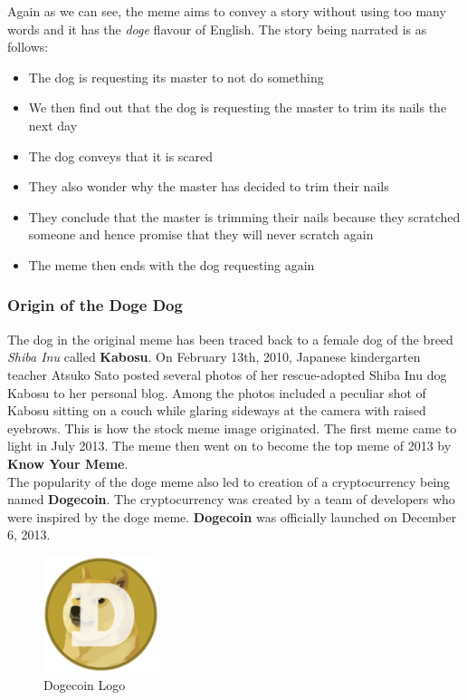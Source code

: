 \def\DevnagVersion{2.17}\documentclass{article}
\begin{document}
Again as we can see, the meme aims to convey a story without using too many words and it has the \textit{doge} flavour of English. The story being narrated is as follows:
\begin{itemize}
    \item The dog is requesting its master to not do something
    \item We then find out that the dog is requesting the master to trim its nails the next day
    \item The dog conveys that it is scared
    \item They also wonder why the master has decided to trim their nails
    \item They conclude that the master is trimming their nails because they scratched someone and hence promise that they will never scratch again
    \item The meme then ends with the dog requesting again
\end{itemize}


\subsubsection{Origin of the Doge Dog}
The dog in the original meme has been traced back to a female dog of the breed \textit{Shiba Inu} called \textbf{Kabosu}. On February 13th, 2010, Japanese kindergarten teacher Atsuko Sato posted several photos of her rescue-adopted Shiba Inu dog Kabosu to her personal blog. Among the photos included a peculiar shot of Kabosu sitting on a couch while glaring sideways at the camera with raised eyebrows. This is how the stock meme image originated. The first meme came to light in July 2013. The meme then went on to become the top meme of 2013 by \textbf{Know Your Meme}.\\
The popularity of the doge meme also led to creation of a cryptocurrency being named \textbf{Dogecoin}. The cryptocurrency was created by a team of developers who were inspired by the doge meme. \textbf{Dogecoin} was officially launched on December 6, 2013.
\begin{figure}[H]
    \centering
    \includegraphics[width=0.3\textwidth]{figures/Dogecoin_logo.png}
    \caption{Dogecoin Logo}
\end{figure}
\end{document}
